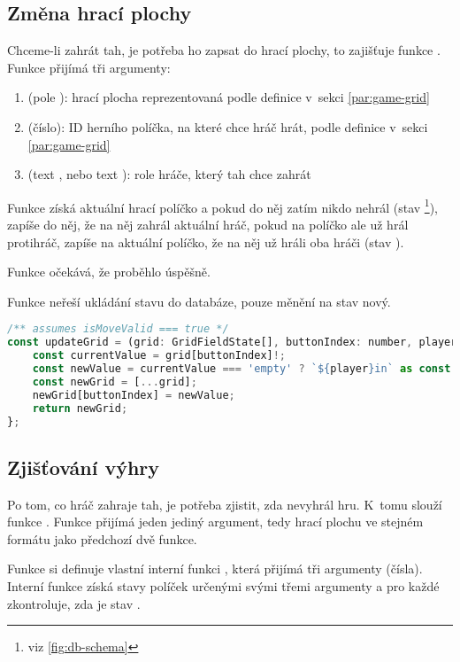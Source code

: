 \subsection{Změna hrací plochy}
Chceme-li zahrát tah, je potřeba ho zapsat do hrací plochy, to zajišťuje funkce
. Funkce přijímá tři argumenty:
\begin{enumerate}
    \item {} (pole ): hrací plocha reprezentovaná podle
        definice v~sekci \ref{par:game-grid}
    \item {} (číslo): ID herního políčka, na které chce hráč hrát,
        podle definice v~sekci \ref{par:game-grid}
    \item {} (text , nebo text ): role hráče,
        který tah chce zahrát
\end{enumerate}

Funkce získá aktuální hrací políčko a pokud do něj zatím nikdo nehrál (stav
\footnote{viz \ref{fig:db-schema}}), zapíše do něj, že na něj zahrál
aktuální hráč, pokud na políčko ale už hrál protihráč, zapíše na aktuální
políčko, že na něj už hráli oba hráči (stav ).

Funkce očekává, že  proběhlo úspěšně.

Funkce neřeší ukládání stavu do databáze, pouze měnění na stav nový.

\begin{lstlisting}[language=JavaScript,caption={Funkce \M{updateGrid}},label={lst:update-grid}]
/** assumes isMoveValid === true */
const updateGrid = (grid: GridFieldState[], buttonIndex: number, player: 'player1' | 'player2') => {
    const currentValue = grid[buttonIndex]!;
    const newValue = currentValue === 'empty' ? `${player}in` as const : 'both';
    const newGrid = [...grid];
    newGrid[buttonIndex] = newValue;
    return newGrid;
};
\end{lstlisting}

\subsection{Zjišťování výhry}
Po tom, co hráč zahraje tah, je potřeba zjistit, zda nevyhrál hru. K~tomu
slouží funkce . Funkce přijímá jeden jediný argument, tedy hrací
plochu ve stejném formátu jako předchozí dvě funkce.

Funkce si definuje vlastní interní funkci , která přijímá tři
argumenty (čísla). Interní funkce získá stavy políček určenými svými třemi
argumenty a pro každé zkontroluje, zda je stav .

